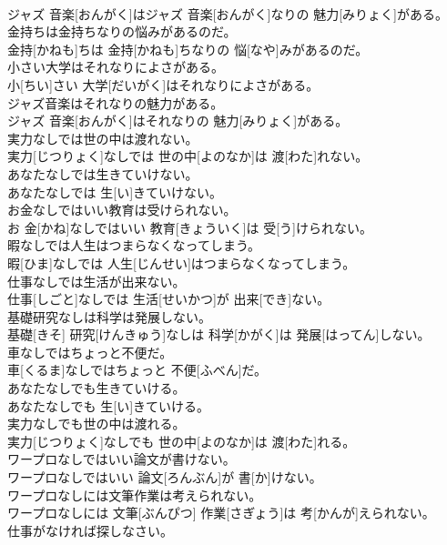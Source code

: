 \documentclass[8pt]{extreport}
\begin{document}
\begin{CJK}{UTF8}{min}
\\	ジャズ 音楽[おんがく]はジャズ 音楽[おんがく]なりの 魅力[みりょく]がある。
\\	金持ちは金持ちなりの悩みがあるのだ。	
\\	金持[かねも]ちは 金持[かねも]ちなりの 悩[なや]みがあるのだ。
\\	小さい大学はそれなりによさがある。	
\\	小[ちい]さい 大学[だいがく]はそれなりによさがある。
\\	ジャズ音楽はそれなりの魅力がある。	
\\	ジャズ 音楽[おんがく]はそれなりの 魅力[みりょく]がある。
\\	実力なしでは世の中は渡れない。	
\\	実力[じつりょく]なしでは 世の中[よのなか]は 渡[わた]れない。
\\	あなたなしでは生きていけない。	
\\	あなたなしでは 生[い]きていけない。
\\	お金なしではいい教育は受けられない。	
\\	お 金[かね]なしではいい 教育[きょういく]は 受[う]けられない。
\\	暇なしでは人生はつまらなくなってしまう。	
\\	暇[ひま]なしでは 人生[じんせい]はつまらなくなってしまう。
\\	仕事なしでは生活が出来ない。	
\\	仕事[しごと]なしでは 生活[せいかつ]が 出来[でき]ない。
\\	基礎研究なしは科学は発展しない。	
\\	基礎[きそ] 研究[けんきゅう]なしは 科学[かがく]は 発展[はってん]しない。
\\	車なしではちょっと不便だ。	
\\	車[くるま]なしではちょっと 不便[ふべん]だ。
\\	あなたなしでも生きていける。	
\\	あなたなしでも 生[い]きていける。
\\	実力なしでも世の中は渡れる。	
\\	実力[じつりょく]なしでも 世の中[よのなか]は 渡[わた]れる。
\\	ワープロなしではいい論文が書けない。	
\\	ワープロなしではいい 論文[ろんぶん]が 書[か]けない。
\\	ワープロなしには文筆作業は考えられない。	
\\	ワープロなしには 文筆[ぶんぴつ] 作業[さぎょう]は 考[かんが]えられない。
\\	仕事がなければ探しなさい。	

\end{CJK}
\end{document}
